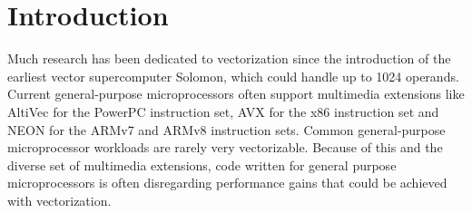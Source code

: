 \documentclass[12pt,a4paper,onecolumn,twoside,openright]{report}
\begin{document}
\newpage
{} \label{listofalg}
\listofalgorithms





\chapter{Introduction}
 \label{chap:intro}



Much research has been dedicated to vectorization since the introduction of the earliest vector supercomputer Solomon, which could handle up to 1024 operands\cite{ball1962solomon}.
Current general-purpose microprocessors often support multimedia extensions like AltiVec\cite{diefendorff2000altivec} for the PowerPC instruction set, AVX\cite{firasta2008intel} for the x86 instruction set and NEON\cite{arm2005neon} for the ARMv7 and ARMv8 instruction sets.
Common general-purpose microprocessor workloads are rarely very vectorizable. Because of this and the diverse set of multimedia extensions, code written for general purpose microprocessors is often disregarding performance gains that could be achieved with vectorization.
\end{document}
